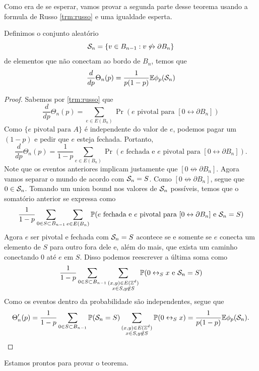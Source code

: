 Como era de se esperar,
vamos provar a segunda parte
desse teorema usando a formula de Russo \ref{trm:russo} e uma igualdade esperta.

\begin{lemma}
	Definimos o conjunto aleatório
	\[
		\mathcal{S}_n = \{v \in B_{n-1} : v \not \leftrightarrow \partial B_n \}
	\]
	de elementos que não conectam ao bordo de $B_n$, temos que
	\begin{equation}
		\frac{d}{dp} \Theta_n (p) = \frac{1}{p(1-p)} \mathbb{E} \phi_p(\mathcal{S}_n)
	\end{equation}
\end{lemma}
\begin{proof}
	Sabemos por \ref{trm:russo} que
	\[
		\frac{d}{dp} \Theta_n(p) = \sum_{e \in E(B_n)} \Pr(e \text{ pivotal
		para } [0 \leftrightarrow \partial B_n])
	\]
	Como $\{e \text{ pivotal para } A\}$ é independente do valor de $e$,
	podemos pagar
	um $(1-p)$ e pedir que $e$ esteja fechada. Portanto,
	\[
		\frac{d}{dp} \Theta_n(p) = \frac{1}{1-p}\sum_{e \in E(B_n)} \Pr(e
		\text{ fechada e } e \text{ pivotal para } [0 \leftrightarrow \partial B_n]).
	\]
	Note que os eventos anteriores implicam justamente que $[0 \not
	\leftrightarrow \partial B_n]$.
	Agora vamos separar o mundo de acordo com $\mathcal{S}_n = S$.
	Como $[0 \not \leftrightarrow \partial B_n]$, segue que $0 \in
	\mathcal{S}_n$. Tomando um union bound nos valores de $\mathcal{S}_n$
	possíveis, temos que o somatório anterior se expressa como
	\[
		\frac{1}{1-p}\sum_{0 \in S \subset B_{n-1}}
		\sum_{e \in E(B_n)}
		\mathbb{P}(e \text{ fechada e } e \text{ pivotal para }
		[0 \leftrightarrow \partial B_n] \text{ e } \mathcal{S}_n = S)
	\]
	Agora $e$ ser pivotal e fechada com $\mathcal{S}_n = S$ acontece se e
	somente se $e$ conecta
	um elemento de $S$ para outro fora dele e, além do mais,
	que exista um caminho conectando $0$ até $e$ em $S$. Disso podemos
	reescrever a última soma como
	\[
		\frac{1}{1-p}\sum_{0 \in S \subset B_{n-1}}
		\sum_{\substack{(x,y) \in E(\mathbb{Z}^d)\\ x \in S, y \not \in S}}
		\mathbb{P}(0 \leftrightarrow_S x \text{ e } \mathcal{S}_n = S)
	\]
	Como os eventos dentro da probabilidade são independentes, segue que
	\[
		\Theta_n'(p) =
		\frac{1}{1-p}\sum_{0 \in S \subset B_{n-1}} \mathbb{P}(\mathcal{S}_n = S)
		\sum_{\substack{(x,y) \in E(\mathbb{Z}^d)\\ x \in S, y \not \in S}}
		\mathbb{P}(0 \leftrightarrow_S x) = \frac{1}{p(1-p)}\mathbb{E} \phi_p(\mathcal{S}_n).
	\]
\end{proof}

Estamos prontos para provar o teorema.

